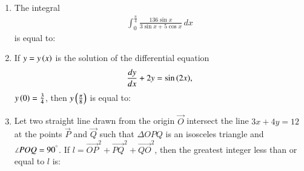 \documentclass[journal]{IEEEtran}
\numberwithin{equation}{enumi}
\numberwithin{figure}{enumi}
\begin{document}
\begin{enumerate}

    \item 
    The integral 
    \begin{align*}
        \int_0^{\frac{\pi}{4}}\frac{136\sin{x}}{3\sin{x} + 5\cos{x}}\, dx 
    \end{align*}
    is equal to:

    \hfill{}

    \begin{enumerate}
    \end{enumerate}

    \item 
    If $y = y\left(x\right)$ is the solution of the differential equation 
    \begin{align*}
        \frac{dy}{dx} + 2y = \sin{\ensuremath{\left(2x\right)}},
    \end{align*}
    $y\left(0\right) = \frac{3}{4}$, then $y\left(\frac{\pi}{8}\right)$ is equal to:

    \hfill{}

    \begin{enumerate}
    \end{enumerate}

    \item 
    Let two straight line drawn from the origin $\vec{O}$ intersect the line $3x + 4y = 12$ at the points $\vec{P}$ and $\vec{Q}$ such that $\Delta OPQ$ is an isosceles triangle and $\angle POQ = 90^{\degree}$. If $l = \vec{OP}^2 + \vec{PQ}^2 + \vec{QO}^2$, then the greatest integer less than or equal to $l$ is:


\end{enumerate}
\end{document}
